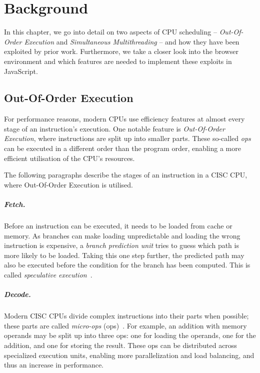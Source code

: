 \documentclass[11pt,
  titlepage=false,
  parskip=half,      %
]{scrreprt}
\begin{document}
\chapter{Background}
\label{ch:background}

In this chapter, we go into detail on two aspects of CPU scheduling
-- \textit{Out-Of-Order Execution} and \textit{Simultaneous Multithreading} --
and how they have been exploited by prior work.
Furthermore, we take a closer look into the browser environment and which features are needed to implement these exploits in JavaScript.

\section{Out-Of-Order Execution}
\label{sec:outoforderexecution}
For performance reasons, modern CPUs use efficiency features at almost every stage of an instruction's execution.
One notable feature is \textit{Out-Of-Order Execution},
where instructions are split up into smaller parts.
These so-called \textit{\textmu ops} can be executed in a different order than the program order,
enabling a more efficient utilisation of the CPU's resources.

The following paragraphs describe the stages of an instruction in a CISC CPU,
where Out-Of-Order Execution is utilised.

\paragraph{Fetch.}
Before an instruction can be executed, it needs to be loaded from cache or memory.
As branches can make loading unpredictable and loading the wrong instruction is expensive, a \textit{branch prediction unit} tries to guess which path is more likely to be loaded.
Taking this one step further, the predicted path may also be executed before the condition for the branch has been computed.
This is called \textit{speculative execution}~\cite{AMD2020OptimizationEPYC7002}.

\paragraph{Decode.}
Modern CISC CPUs divide complex instructions into their parts when possible;
these parts are called \textit{micro-ops} (\textmu ops)~\cite{AMD2020OptimizationEPYC7002}.
For example, an addition with memory operands may be split up into three \textmu ops: one for loading the operands, one for the addition, and one for storing the result.
These \textmu ops can be distributed across specialized execution units, enabling more parallelization and load balancing, and thus an increase in performance.
\end{document}
